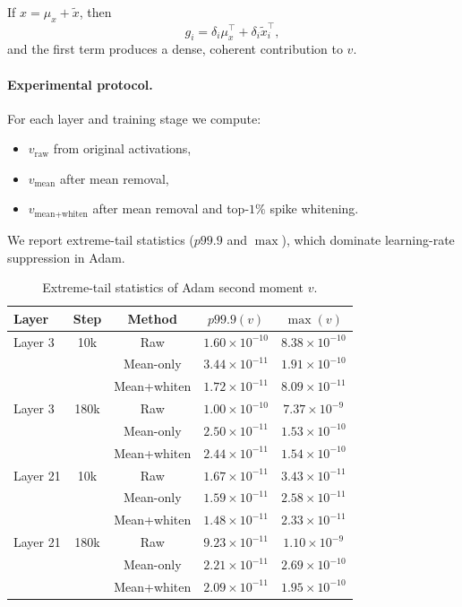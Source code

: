 If $x = \mu_x + \tilde{x}$, then
\[
g_i = \delta_i \mu_x^\top + \delta_i \tilde{x}_i^\top,
\]
and the first term produces a dense, coherent contribution to $v$.

\paragraph{Experimental protocol.}
For each layer and training stage we compute:
\begin{itemize}
\item $v_{\text{raw}}$ from original activations,
\item $v_{\text{mean}}$ after mean removal,
\item $v_{\text{mean+whiten}}$ after mean removal and top-$1\%$ spike whitening.
\end{itemize}
We report extreme-tail statistics ($p99.9$ and $\max$), which dominate
learning-rate suppression in Adam.

\begin{table}[t]
\centering
\caption{Extreme-tail statistics of Adam second moment $v$.}
\label{tab:adam_v_bias}
\begin{tabular}{lcccc}
\toprule
Layer & Step & Method & $p99.9(v)$ & $\max(v)$ \\
\midrule
Layer 3 & 10k & Raw & $1.60\times10^{-10}$ & $8.38\times10^{-10}$ \\
 & & Mean-only & $3.44\times10^{-11}$ & $1.91\times10^{-10}$ \\
 & & Mean+whiten & $1.72\times10^{-11}$ & $8.09\times10^{-11}$ \\
\midrule
Layer 3 & 180k & Raw & $1.00\times10^{-10}$ & $7.37\times10^{-9}$ \\
 & & Mean-only & $2.50\times10^{-11}$ & $1.53\times10^{-10}$ \\
 & & Mean+whiten & $2.44\times10^{-11}$ & $1.54\times10^{-10}$ \\
\midrule
Layer 21 & 10k & Raw & $1.67\times10^{-11}$ & $3.43\times10^{-11}$ \\
 & & Mean-only & $1.59\times10^{-11}$ & $2.58\times10^{-11}$ \\
 & & Mean+whiten & $1.48\times10^{-11}$ & $2.33\times10^{-11}$ \\
\midrule
Layer 21 & 180k & Raw & $9.23\times10^{-11}$ & $1.10\times10^{-9}$ \\
 & & Mean-only & $2.21\times10^{-11}$ & $2.69\times10^{-10}$ \\
 & & Mean+whiten & $2.09\times10^{-11}$ & $1.95\times10^{-10}$ \\
\bottomrule
\end{tabular}
\end{table}


